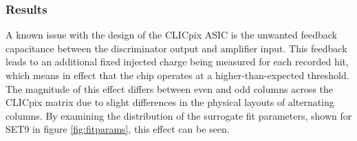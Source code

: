 
\subsubsection{Results}
\label{sec:testpulsecalibrationresults}

A known issue with the design of the CLICpix ASIC is the unwanted feedback capacitance between the discriminator output and amplifier input.  This feedback leads to an additional fixed injected charge being measured for each recorded hit, which means in effect that the chip operates at a higher-than-expected threshold.  The magnitude of this effect differs between even and odd columns across the CLICpix matrix due to slight differences in the physical layouts of alternating columns.  By examining the distribution of the surrogate fit parameters, shown for SET9 in figure \ref{fig:fitparams}, this effect can be seen.  

